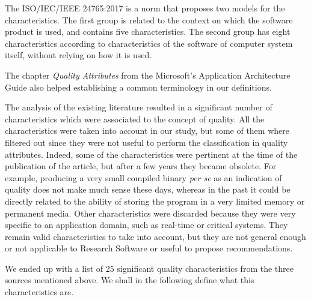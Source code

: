 The ISO/IEC/IEEE 24765:2017 is a norm that proposes two models for the characteristics. The first group is related to the context on which the software product is used, and contains five characteristics. The second group has eight characteristics according to characteristics of the software of computer system itself, without relying on how it is used.

The chapter \textit{Quality Attributes} from the Microsoft's Application Architecture Guide also helped establishing a common terminology in our definitions.

The analysis of the existing literature resulted in a significant number of characteristics which were associated to the concept of quality. All the characteristics were taken into account in our study, but some of them where filtered out since they were not useful to perform the classification in quality attributes. Indeed, some of the characteristics were pertinent at the time of the publication of the article, but after a few years they became obsolete. For example, producing a very small compiled binary \textit{per se} as an indication of quality does not make much sense these days, whereas in the past it could be directly related to the ability of storing the program in a very limited memory or permanent media. Other characteristics were discarded because they were very specific to an application domain, such as real-time or critical systems. They remain valid characteristics to take into account, but they are not general enough or not applicable to Research Software or useful to propose recommendations.

We ended up with a list of 25 significant quality characteristics from the three sources mentioned above. We shall in the following define what this characteristics are.

